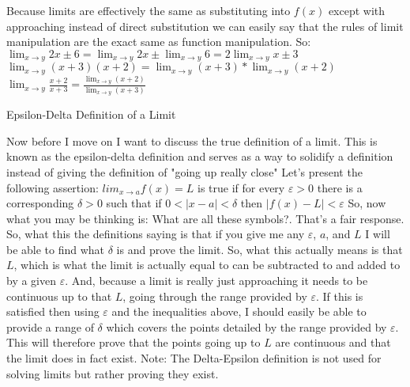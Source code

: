 \documentclass{article}
\begin{document}
Because limits are effectively the same as substituting into $f(x)$ except with approaching instead of direct substitution we can easily say that the rules of limit manipulation are the exact same as function manipulation. So:
\newline
\newline
$\lim_{x\to y} 2x\pm6 = \lim_{x\to y} 2x \pm \lim_{x\to y} 6 = 2\lim_{x\to y} x\pm3$
\newline
\newline
$\lim_{x\to y} (x+3)(x+2) = \lim_{x\to y} (x+3) * \lim_{x\to y} (x+2)$
\newline
\newline
$\lim_{x\to y} \frac{x+2}{x+3} = \frac{\lim_{x\to y} (x+2)}{\lim_{x\to y} (x+3)}$
\newline
\begin{center}
    Epsilon-Delta Definition of a Limit
\end{center}
Now before I move on I want to discuss the true definition of a limit. This is known as the epsilon-delta definition and serves as a way to solidify a definition instead of giving the definition of "going up really close"
\newline
\newline
Let's present the following assertion: $lim_{x \to a} f(x) = L$ is true if for every $\varepsilon > 0$ there is a corresponding $\delta>0$ such that if  $0<|x-a| < \delta$ then $|f(x) - L| < \varepsilon$
\newline
\newline
So, now what you may be thinking is: What are all these symbols?. That's a fair response. So, what this the definitions saying is that if you give me any $\varepsilon$, $a$, and $L$ I will be able to find what $\delta$ is and  prove the limit. So, what this actually means is that $L$, which is what the limit is actually equal to can be subtracted to and added to by a given $\varepsilon$. And, because a limit is really just approaching it needs to be continuous up to that $L$, going through the range provided by $\varepsilon$. If this is satisfied then using $\varepsilon$ and the inequalities above, I should easily be able to provide a range of $\delta$ which covers the points detailed by the range provided by $\varepsilon$. This will therefore prove that the points going up to $L$ are continuous and that the limit does in fact exist. 
\newline
\newline
Note: The Delta-Epsilon definition is not used for solving limits but rather proving they exist. 
\end{document}
